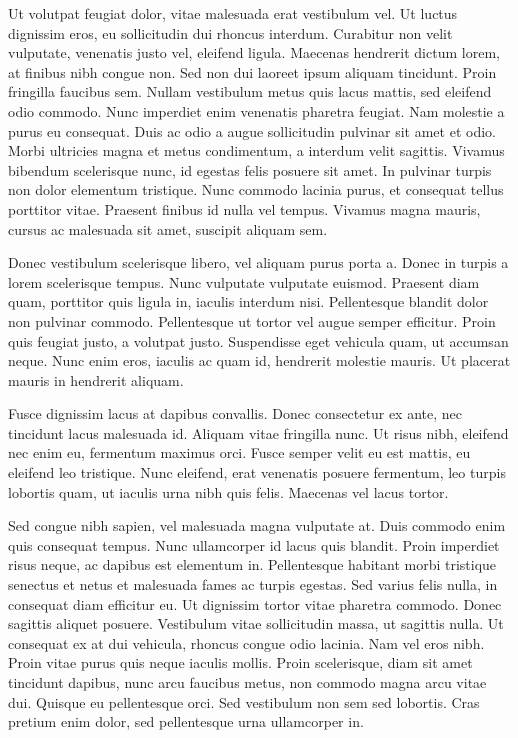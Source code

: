 Ut volutpat feugiat dolor, vitae malesuada erat vestibulum vel. Ut luctus dignissim eros, eu sollicitudin dui rhoncus interdum. Curabitur non velit vulputate, venenatis justo vel, eleifend ligula. Maecenas hendrerit dictum lorem, at finibus nibh congue non. Sed non dui laoreet ipsum aliquam tincidunt. Proin fringilla faucibus sem. Nullam vestibulum metus quis lacus mattis, sed eleifend odio commodo. Nunc imperdiet enim venenatis pharetra feugiat. Nam molestie a purus eu consequat. Duis ac odio a augue sollicitudin pulvinar sit amet et odio. Morbi ultricies magna et metus condimentum, a interdum velit sagittis. Vivamus bibendum scelerisque nunc, id egestas felis posuere sit amet. In pulvinar turpis non dolor elementum tristique. Nunc commodo lacinia purus, et consequat tellus porttitor vitae. Praesent finibus id nulla vel tempus. Vivamus magna mauris, cursus ac malesuada sit amet, suscipit aliquam sem.

Donec vestibulum scelerisque libero, vel aliquam purus porta a. Donec in turpis a lorem scelerisque tempus. Nunc vulputate vulputate euismod. Praesent diam quam, porttitor quis ligula in, iaculis interdum nisi. Pellentesque blandit dolor non pulvinar commodo. Pellentesque ut tortor vel augue semper efficitur. Proin quis feugiat justo, a volutpat justo. Suspendisse eget vehicula quam, ut accumsan neque. Nunc enim eros, iaculis ac quam id, hendrerit molestie mauris. Ut placerat mauris in hendrerit aliquam.

Fusce dignissim lacus at dapibus convallis. Donec consectetur ex ante, nec tincidunt lacus malesuada id. Aliquam vitae fringilla nunc. Ut risus nibh, eleifend nec enim eu, fermentum maximus orci. Fusce semper velit eu est mattis, eu eleifend leo tristique. Nunc eleifend, erat venenatis posuere fermentum, leo turpis lobortis quam, ut iaculis urna nibh quis felis. Maecenas vel lacus tortor.

Sed congue nibh sapien, vel malesuada magna vulputate at. Duis commodo enim quis consequat tempus. Nunc ullamcorper id lacus quis blandit. Proin imperdiet risus neque, ac dapibus est elementum in. Pellentesque habitant morbi tristique senectus et netus et malesuada fames ac turpis egestas. Sed varius felis nulla, in consequat diam efficitur eu. Ut dignissim tortor vitae pharetra commodo. Donec sagittis aliquet posuere. Vestibulum vitae sollicitudin massa, ut sagittis nulla. Ut consequat ex at dui vehicula, rhoncus congue odio lacinia. Nam vel eros nibh. Proin vitae purus quis neque iaculis mollis. Proin scelerisque, diam sit amet tincidunt dapibus, nunc arcu faucibus metus, non commodo magna arcu vitae dui. Quisque eu pellentesque orci. Sed vestibulum non sem sed lobortis. Cras pretium enim dolor, sed pellentesque urna ullamcorper in.

